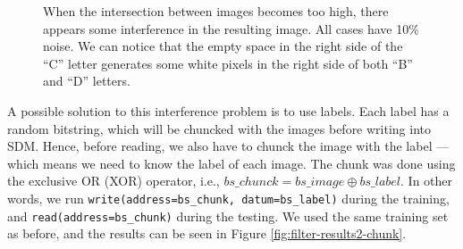 \begin{figure}[!htb]
  \captionsetup[subfigure]{labelformat=empty}




  \caption{When the intersection between images becomes too high, there appears some interference in the resulting image. All cases have 10\% noise. We can notice that the empty space in the right side of the ``C'' letter generates some white pixels in the right side of both ``B'' and ``D'' letters.
  \label{fig:filter-results2}
  }
\end{figure}

A possible solution to this interference problem is to use labels. Each label has a random bitstring, which will be chuncked with the images before writing into SDM. Hence, before reading, we also have to chunck the image with the label --- which means we need to know the label of each image. The chunk was done using the exclusive OR (XOR) operator, i.e., $bs\_chunck = bs\_image \oplus bs\_label$. In other words, we run \lstinline{write(address=bs_chunk, datum=bs_label)} during the training, and \lstinline{read(address=bs_chunk)} during the testing. We used the same training set as before, and the results can be seen in Figure \ref{fig:filter-results2-chunk}.

